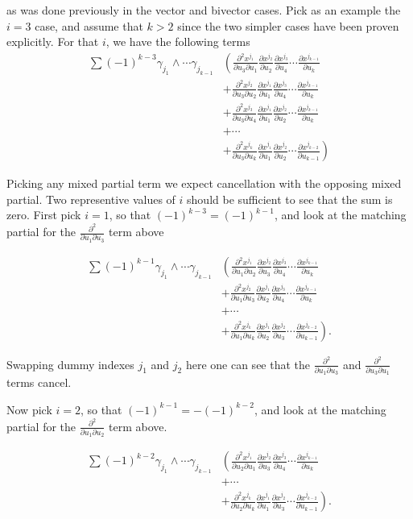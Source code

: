 \documentclass{article}
\newcommand{\PD}[2]{\frac{\partial {#2}}{\partial {#1}}}
\newcommand{\PDD}[3]{\frac{\partial^2 {#3}}{\partial {#1}\partial {#2}}}
\begin{document}
as was done previously in the vector and bivector cases.  Pick as an example the $i=3$ case, and assume that $k > 2$ since
the two simpler cases have been proven explicitly.  For that $i$, we have the following terms
\begin{align*}
\sum (-1)^{k-3} \gamma_{j_1} \wedge \cdots \gamma_{j_{k-1}} 
&\left(\PDD{u_3}{u_1}{x^{j_1}} \PD{u_2}{x^{j_{2}}} \PD{u_4}{x^{j_3}} \cdots \PD{u_k}{x^{j_{k-1}}}\right. \\
&+\PDD{u_3}{u_2}{x^{j_2}} \PD{u_1}{x^{j_1}} \PD{u_4}{x^{j_3}} \cdots \PD{u_k}{x^{j_{k-1}}} \\
&+\PDD{u_3}{u_4}{x^{j_3}} \PD{u_1}{x^{j_1}} \PD{u_2}{x^{j_2}} \cdots \PD{u_k}{x^{j_{k-1}}} \\
&+\cdots \\
&+\left.\PDD{u_3}{u_k}{x^{j_k}} \PD{u_1}{x^{j_1}} \PD{u_2}{x^{j_2}} \cdots \PD{u_{k-1}}{x^{j_{k-2}}}\right)
\end{align*}

Picking any mixed partial term we expect cancellation with the opposing mixed partial.  Two representive values of $i$ should be sufficient to see that the sum
is zero.  First pick $i=1$, so that $(-1)^{k-3} = (-1)^{k-1}$, and look at the 
matching partial for the $\PDD{u_1}{u_3}{}$ term above

\begin{align*}
\sum (-1)^{k-1} \gamma_{j_1} \wedge \cdots \gamma_{j_{k-1}} 
&\left(\PDD{u_1}{u_2}{x^{j_1}} \PD{u_3}{x^{j_{2}}} \PD{u_4}{x^{j_3}} \cdots \PD{u_k}{x^{j_{k-1}}}\right. \\
&+\PDD{u_1}{u_3}{x^{j_2}} \PD{u_2}{x^{j_1}} \PD{u_4}{x^{j_3}} \cdots \PD{u_k}{x^{j_{k-1}}} \\
&+\cdots \\
&+\left.\PDD{u_1}{u_k}{x^{j_k}} \PD{u_2}{x^{j_1}} \PD{u_3}{x^{j_2}} \cdots \PD{u_{k-1}}{x^{j_{k-2}}}\right).
\end{align*}

Swapping dummy indexes $j_1$ and $j_2$ here one can see that the 
$\PDD{u_1}{u_3}{}$ and $\PDD{u_3}{u_1}{}$ terms cancel.

Now pick $i=2$, so 
that $(-1)^{k-1} = -(-1)^{k-2}$, and look at the 
matching partial for the $\PDD{u_1}{u_2}{}$ term above.

\begin{align*}
\sum (-1)^{k-2} \gamma_{j_1} \wedge \cdots \gamma_{j_{k-1}} 
&\left(\PDD{u_2}{u_1}{x^{j_1}} \PD{u_3}{x^{j_{2}}} \PD{u_4}{x^{j_3}} \cdots \PD{u_k}{x^{j_{k-1}}}\right. \\
&+\cdots \\
&+\left.\PDD{u_2}{u_k}{x^{j_k}} \PD{u_1}{x^{j_1}} \PD{u_3}{x^{j_2}} \cdots \PD{u_{k-1}}{x^{j_{k-2}}}\right).
\end{align*}
\end{document}
